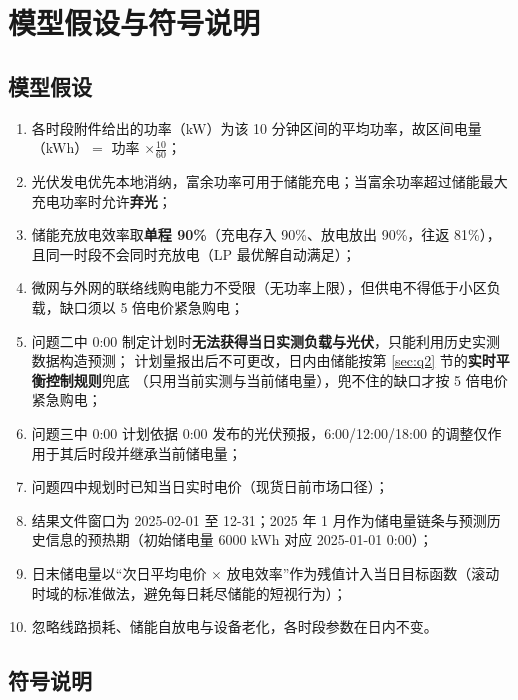 \section{模型假设与符号说明}
\label{sec:assume}

\subsection{模型假设}

\begin{enumerate}[label=\textbf{假设\arabic*.}, leftmargin=4.2em, itemsep=2pt]
\item 各时段附件给出的功率（kW）为该 10 分钟区间的平均功率，故区间电量（kWh）$=$ 功率 $\times \frac{10}{60}$；
\item 光伏发电优先本地消纳，富余功率可用于储能充电；当富余功率超过储能最大充电功率时允许\textbf{弃光}；
\item 储能充放电效率取\textbf{单程 90\%}（充电存入 90\%、放电放出 90\%，往返 81\%），且同一时段不会同时充放电（LP 最优解自动满足）；
\item 微网与外网的联络线购电能力不受限（无功率上限），但供电不得低于小区负载，缺口须以 5 倍电价紧急购电；
\item 问题二中 0:00 制定计划时\textbf{无法获得当日实测负载与光伏}，只能利用历史实测数据构造预测；
计划量报出后不可更改，日内由储能按第 \ref{sec:q2} 节的\textbf{实时平衡控制规则}兜底
（只用当前实测与当前储电量），兜不住的缺口才按 5 倍电价紧急购电；
\item 问题三中 0:00 计划依据 0:00 发布的光伏预报，6:00/12:00/18:00 的调整仅作用于其后时段并继承当前储电量；
\item 问题四中规划时已知当日实时电价（现货日前市场口径）；
\item 结果文件窗口为 2025-02-01 至 12-31；2025 年 1 月作为储电量链条与预测历史信息的预热期（初始储电量 6000 kWh 对应 2025-01-01 0:00）；
\item 日末储电量以“次日平均电价 $\times$ 放电效率”作为残值计入当日目标函数（滚动时域的标准做法，避免每日耗尽储能的短视行为）；
\item 忽略线路损耗、储能自放电与设备老化，各时段参数在日内不变。
\end{enumerate}

\subsection{符号说明}

